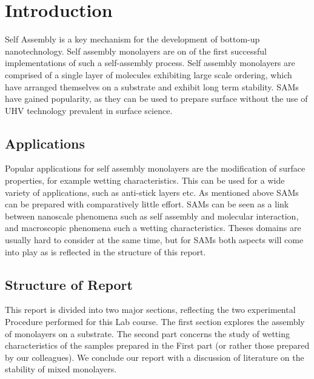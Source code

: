 \section{Introduction}


Self Assembly is a key mechanism for the development of bottom-up nanotechnology. Self assembly monolayers are on of the first successful implementations of such a self-assembly process. Self assembly monolayers are comprised of a single layer of molecules exhibiting large scale ordering, which have arranged themselves on a substrate and exhibit long term stability. SAMs have gained popularity, as they can be used to prepare surface without the use of UHV technology prevalent in surface science.

\subsection{Applications}

Popular applications for self assembly monolayers are the modification of surface properties, for example wetting characteristics. This can be used for a wide variety of applications, such as anti-stick layers etc. As mentioned above SAMs can be prepared with comparatively little effort. SAMs can be seen as a link between nanoscale phenomena such as self assembly and molecular interaction, and macroscopic phenomena such a wetting characteristics. Theses domains are usually hard to consider at the same time, but for SAMs both aspects will come into play as is reflected in the structure of this report.

\subsection{Structure of Report}

This report is divided into two major sections, reflecting the two experimental Procedure performed for this Lab course. The first section explores the assembly of monolayers on a substrate. The second part concerns the study of wetting characteristics of the samples prepared in the First part (or rather those prepared by our colleagues). We conclude our report with a discussion of literature on the stability of mixed monolayers.